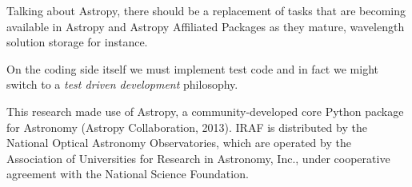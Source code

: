 \documentclass[11pt,twoside]{article}
\begin{document}
Talking about Astropy, there should be a replacement of tasks that are becoming
available in Astropy and Astropy Affiliated Packages as they mature, wavelength
solution storage for instance.

On the coding side itself we must implement test code and in fact we might switch
to a \emph{test driven development} philosophy.

\acknowledgements  This research made use of Astropy, a community-developed core Python package for Astronomy (Astropy Collaboration, 2013). IRAF is distributed by the National Optical Astronomy Observatories, which are operated by the Association of Universities for Research in Astronomy, Inc., under cooperative agreement with the National Science Foundation.


\end{document}
